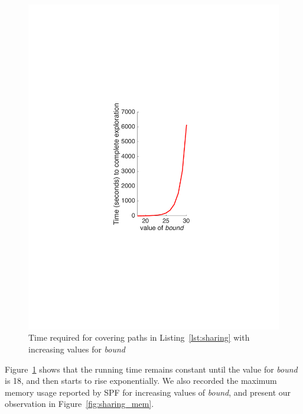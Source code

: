 \begin{figure}[]
\caption{Time required for covering paths in Listing~\ref{lst:sharing} with increasing values for \textit{bound}}
\label{fig:sharing_time}
\includegraphics[width=\columnwidth]{figures/sharing_time}
\end{figure}
%
Figure~\ref{fig:sharing_time} shows that the running time remains constant until the value for \textit{bound} is 18, and then starts to rise exponentially. 
%
We also recorded the maximum memory usage reported by SPF for increasing values of \textit{bound}, and present our observation in Figure~\ref{fig:sharing_mem}.
